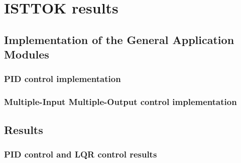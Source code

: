 \chapter{ISTTOK  results }

\section{Implementation of the General Application Modules }
\subsection{PID control implementation}
\subsection{Multiple-Input Multiple-Output control implementation}

\section{Results}
\subsection{PID control and LQR control results}